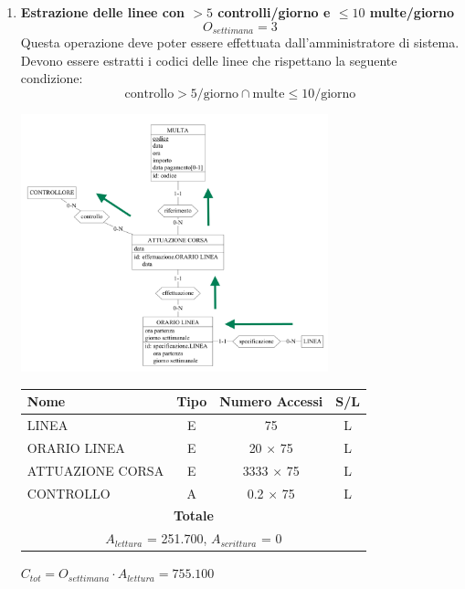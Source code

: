 \documentclass[12pt,a4paper]{report}
\begin{document}
\begin{enumerate}[label=\textbf{\arabic*}]
	\item \textbf{Estrazione delle linee con $>5$ controlli/giorno e $\leq 10$ multe/giorno} \label{op13} \\
	\[{O_{settimana} = 3}\]
	Questa operazione deve poter essere effettuata dall'amministratore di sistema.\\
	Devono essere estratti i codici delle linee che rispettano la seguente condizione:
	\[
	\text{controllo} > 5/\text{giorno} \cap \text{multe} \leq 10/\text{giorno}
	\]

	\begin{center}
	\includegraphics[width=0.7\textwidth]{VisualLineeMulteControlli}
	\end{center}

	\begin{table}[H]
	\centering
	\begin{tabular}{|l|c|c|c|}
	\hline
	Nome & Tipo & Numero Accessi & S/L \\
	\hline
	LINEA & E & 75 & L \\
	\hline
	ORARIO LINEA & E & 20 $\times$ 75 & L \\
	\hline
	ATTUAZIONE CORSA & E & 3333 $\times$ 75 & L \\
	\hline
	CONTROLLO & A & 0.2 $\times$ 75 & L \\
	    \hline
	    \multicolumn{4}{c}{\textbf{Totale}} \\
	    \multicolumn{4}{c}{${A_{lettura}}$ = 251.700, ${A_{scrittura}}$ = 0} \\
	    \hline
	\end{tabular}
	\end{table}
	    \begin{center}
	    ${C_{tot} = {O_{settimana}}\cdot {A_{lettura}} = 755.100}$
	    \end{center}


\end{enumerate}
\end{document}
